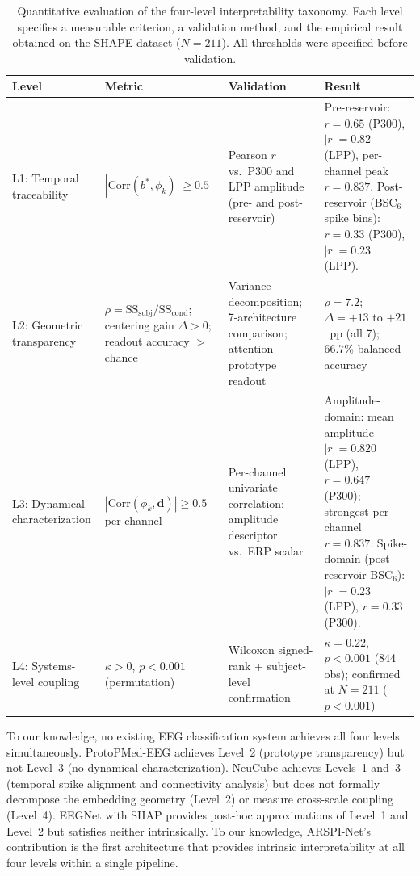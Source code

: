 \begin{table}[t]
\centering
\caption{Quantitative evaluation of the four-level interpretability taxonomy. Each level specifies a measurable criterion, a validation method, and the empirical result obtained on the SHAPE dataset ($N = 211$). All thresholds were specified before validation.}
\label{tab:taxonomy_metrics}
\small
\begin{tabular}{p{2.5cm}p{3.5cm}p{3.5cm}p{3.5cm}}
\toprule
\textbf{Level} & \textbf{Metric} & \textbf{Validation} & \textbf{Result} \\
\midrule
L1: Temporal traceability & $|\text{Corr}(b^*, \phi_k)| \geq 0.5$ & Pearson $r$ vs.\ P300 and LPP amplitude (pre- and post-reservoir) & Pre-reservoir: $r = 0.65$ (P300), $|r| = 0.82$ (LPP), per-channel peak $r = 0.837$. Post-reservoir (BSC$_6$ spike bins): $r = 0.33$ (P300), $|r| = 0.23$ (LPP). \\
\midrule
L2: Geometric transparency & $\rho = \text{SS}_\text{subj} / \text{SS}_\text{cond}$; centering gain $\Delta > 0$; readout accuracy $>$ chance & Variance decomposition; 7-architecture comparison; attention-prototype readout & $\rho = 7.2$; $\Delta = +13$ to $+21$~pp (all 7); $66.7\%$ balanced accuracy \\
\midrule
L3: Dynamical characterization & $|\text{Corr}(\phi_k, \mathbf{d})| \geq 0.5$ per channel & Per-channel univariate correlation: amplitude descriptor vs.\ ERP scalar & Amplitude-domain: mean amplitude $|r| = 0.820$ (LPP), $r = 0.647$ (P300); strongest per-channel $r = 0.837$. Spike-domain (post-reservoir BSC$_6$): $|r| = 0.23$ (LPP), $r = 0.33$ (P300). \\
\midrule
L4: Systems-level coupling & $\kappa > 0$, $p < 0.001$ (permutation) & Wilcoxon signed-rank + subject-level confirmation & $\kappa = 0.22$, $p < 0.001$ (844 obs); confirmed at $N = 211$ ($p < 0.001$) \\
\bottomrule
\end{tabular}
\end{table}

To our knowledge, no existing EEG classification system achieves all four levels simultaneously. ProtoPMed-EEG \cite{barnett_protopmed_2024} achieves Level~2 (prototype transparency) but not Level~3 (no dynamical characterization). NeuCube \cite{kasabov_neucube_2014} achieves Levels~1 and~3 (temporal spike alignment and connectivity analysis) but does not formally decompose the embedding geometry (Level~2) or measure cross-scale coupling (Level~4). EEGNet with SHAP provides post-hoc approximations of Level~1 and Level~2 but satisfies neither intrinsically. To our knowledge, ARSPI-Net's contribution is the first architecture that provides intrinsic interpretability at all four levels within a single pipeline.


